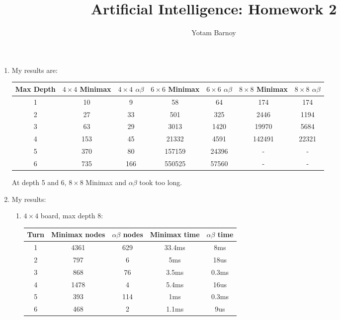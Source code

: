 \documentclass[12pt]{article}
\title{Artificial Intelligence: Homework 2}
\author{Yotam Barnoy}
\date{}
\begin{document}
\large
\maketitle
\thispagestyle{headings}

\vspace{-.5in}

\begin{enumerate}
	\item My results are:

		\begin{table}[h]
		\centering
		\begin{tabular}{|c|c|c|c|c|c|c|}
			\hline
			Max Depth & \( 4 \times 4 \) Minimax & \( 4 \times 4 \) \( \alpha \beta \) & \( 6 \times 6 \) Minimax & \( 6 \times 6 \) \( \alpha \beta \) & \( 8 \times 8 \) Minimax & \( 8 \times 8 \) \( \alpha \beta \) \\ \hline
			1 &  10  & 9   &     58 &    64 &     174 &   174 \\ \hline
			2 &  27  & 33  &    501 &   325 &    2446 &  1194 \\ \hline
			3 &  63  & 29  &   3013 &  1420 &   19970 &  5684 \\ \hline
			4 &  153 & 45  &  21332 &  4591 &  142491 & 22321 \\ \hline
			5 &  370 & 80  & 157159 & 24396 &   -     &   -   \\ \hline
			6 &  735 & 166 & 550525 & 57560 &	 	-     &   -   \\ \hline
		\end{tabular}
		\end{table}

	At depth 5 and 6, $8\times8$ Minimax and $\alpha\beta$ took too long.

\item My results:
	\begin{enumerate}	
		\item 
			$4 \times 4$ board, max depth 8: \\
	 \begin{table}[h]
		 \centering
		 \begin{tabular}{|c|c|c|c|c|}
			 \hline
			 Turn & Minimax nodes & \( \alpha\beta \) nodes & Minimax time & \( \alpha\beta \) time \\ \hline
			 1 & 4361 & 629  & 33.4ms & 8ms      \\ \hline
			 2 & 797  & 6    &  5ms   & 18us     \\ \hline
			 3 & 868  & 76   &  3.5ms & 0.3ms    \\ \hline
			 4 & 1478 & 4    & 5.4ms  & 16us     \\ \hline
			 5 & 393  & 114  & 1ms    & 0.3ms    \\ \hline
			 6 & 468  & 2    & 1.1ms  & 9us      \\ \hline


\end{tabular}
\end{table}
\end{enumerate}
\end{enumerate}
\end{document}
